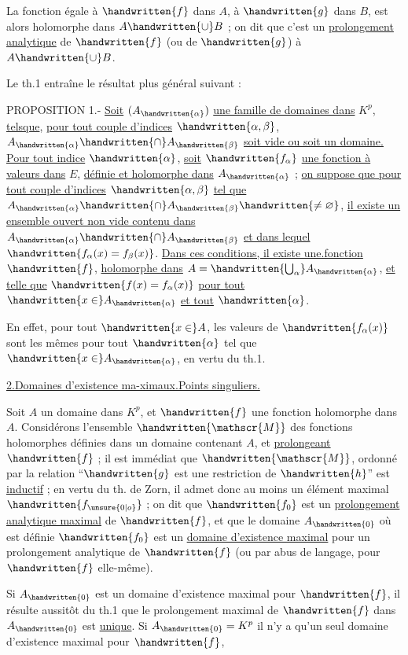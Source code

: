 La fonction égale à $\handwritten{f}$ dans $A$, à $\handwritten{g}$ dans $B$, est alors holomorphe dans $A\handwritten{\cup}B$ ; on dit que c'est un \uline{prolongement analytique} de $\handwritten{f}$ (ou de $\handwritten{g}$) à $A\handwritten{\cup}B$.

Le th.1 entraîne le résultat plus général suivant :

PROPOSITION 1.- \uline{Soit} $(A_{\handwritten{\alpha}})$ \uline{une famille de domaines dans} $K^p$, \uline{telsque}, \uline{pour tout couple d'indices} $\handwritten{\alpha,\beta}$, $A_{\handwritten{\alpha}}\handwritten{\cap}A_{\handwritten{\beta}}$ \uline{soit vide ou soit un domaine. Pour tout indice} $\handwritten{\alpha}$, \uline{soit} $\handwritten{f_\alpha}$ \uline{une fonction à valeurs dans} $E$, \uline{définie et holomorphe dans} $A_{\handwritten{\alpha}}$ ; \uline{on suppose que pour tout couple d'indices} $\handwritten{\alpha,\beta}$ \uline{tel que} $A_{\handwritten{\alpha}}\handwritten{\cap}A_{\handwritten{\beta}}\handwritten{\neq\varnothing}$, \uline{il existe un ensemble ouvert non vide contenu dans} $A_{\handwritten{\alpha}}\handwritten{\cap}A_{\handwritten{\beta}}$ \uline{et dans lequel} $\handwritten{f_\alpha(x)=f_\beta(x)}$. \uline{Dans ces conditions, il existe une.fonction} $\handwritten{f}$, \uline{holomorphe dans} $A=\handwritten{\bigcup_\alpha}A_{\handwritten{\alpha}}$, \uline{et telle que} $\handwritten{f(x)=f_\alpha(x)}$ \uline{pour tout} $\handwritten{x\in}A_{\handwritten{\alpha}}$ \uline{et tout} $\handwritten{\alpha}$.

En effet, pour tout $\handwritten{x\in}A$, les valeurs de $\handwritten{f_\alpha(x)}$ sont les mêmes pour tout $\handwritten{\alpha}$ tel que $\handwritten{x\in}A_{\handwritten{\alpha}}$, en vertu du th.1.

\uline{2.}\quad \uline{Domaines d'existence ma-ximaux.}\quad \uline{Points singuliers.}

Soit $A$ un domaine dans $K^p$, et $\handwritten{f}$ une fonction holomorphe dans $A$. Considérons l'ensemble $\handwritten{\mathscr{M}}$ des fonctions holomorphes définies dans un domaine contenant $A$, et \uline{prolongeant} $\handwritten{f}$ ; il est immédiat que $\handwritten{\mathscr{M}}$, ordonné par la relation ``$\handwritten{g}$ est une restriction de $\handwritten{h}$'' est \uline{inductif} ; en vertu du th. de Zorn, il admet donc au moins un élément maximal $\handwritten{f_{\unsure{0|o}}}$ ;  on dit que $\handwritten{f_{0}}$ est un \uline{prolongement analytique maximal} de $\handwritten{f}$, et que le domaine $A_{\handwritten{0}}$ où est définie $\handwritten{f_{0}}$ est un \uline{domaine d'existence maximal} pour un prolongement analytique de $\handwritten{f}$ (ou par abus de langage, pour $\handwritten{f}$ elle-même).

Si $A_{\handwritten{0}}$ est un domaine d'existence maximal pour $\handwritten{f}$, il résulte aussitôt du th.1 que le prolongement maximal de $\handwritten{f}$ dans $A_{\handwritten{0}}$ est \uline{unique}. Si $A_{\handwritten{0}}=K^p$ il n'y a qu'un seul domaine d'existence maximal pour $\handwritten{f}$,
